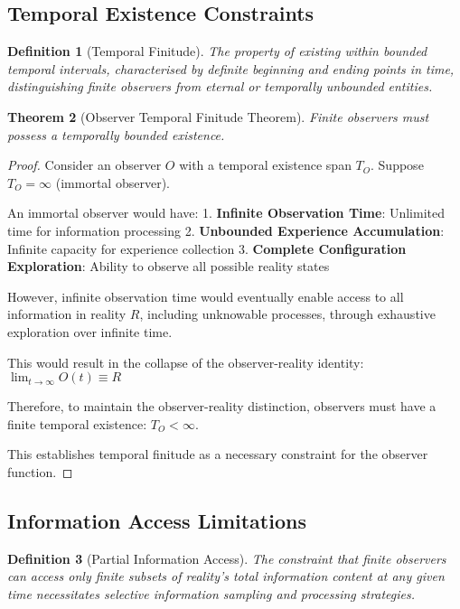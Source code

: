 \documentclass[12pt,a4paper]{article}
\newtheorem{theorem}{Theorem}[section]
\newtheorem{definition}[theorem]{Definition}
\begin{document}
\subsection{Temporal Existence Constraints}

\begin{definition}[Temporal Finitude]
The property of existing within bounded temporal intervals, characterised by definite beginning and ending points in time, distinguishing finite observers from eternal or temporally unbounded entities.
\end{definition}

\begin{theorem}[Observer Temporal Finitude Theorem]
Finite observers must possess a temporally bounded existence.
\end{theorem}

\begin{proof}
Consider an observer $O$ with a temporal existence span $T_O$. Suppose $T_O = \infty$ (immortal observer).

An immortal observer would have:
1. \textbf{Infinite Observation Time}: Unlimited time for information processing
2. \textbf{Unbounded Experience Accumulation}: Infinite capacity for experience collection
3. \textbf{Complete Configuration Exploration}: Ability to observe all possible reality states

However, infinite observation time would eventually enable access to all information in reality $R$, including unknowable processes, through exhaustive exploration over infinite time.

This would result in the collapse of the observer-reality identity: $\lim_{t \to \infty} O(t) \equiv R$

Therefore, to maintain the observer-reality distinction, observers must have a finite temporal existence: $T_O < \infty$.

This establishes temporal finitude as a necessary constraint for the observer function.
\end{proof}

\subsection{Information Access Limitations}

\begin{definition}[Partial Information Access]
The constraint that finite observers can access only finite subsets of reality's total information content at any given time necessitates selective information sampling and processing strategies.
\end{definition}
\end{document}
